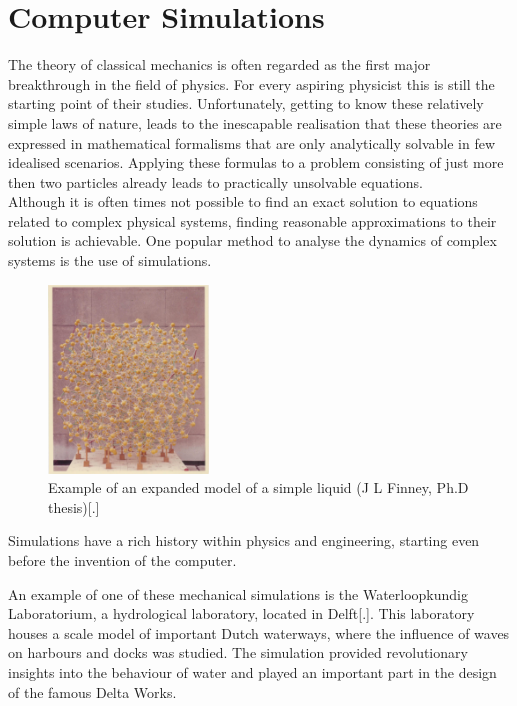 \newpage
\section{Computer Simulations}

The theory of classical mechanics is often regarded as the first major breakthrough in
the field of physics. For every aspiring physicist this is still the starting point of
their studies. Unfortunately, getting to know these relatively simple laws of nature,
leads to the inescapable realisation that these theories are expressed in mathematical
formalisms that are only analytically solvable in few idealised scenarios. Applying these
formulas to a problem consisting of just more then two particles already leads to
practically unsolvable equations.\\

Although it is often times not possible to find an exact solution to equations
related to complex physical systems, finding reasonable approximations to their solution
is achievable. One popular method to analyse the dynamics of complex systems is the use
of simulations.\\

\begin{figure}
  \begin{center}
    \includegraphics[width=0.38\textwidth]{Figures/WaterModel.png}
  \end{center}
  \caption{Example of an expanded model of a simple liquid (J L Finney, Ph.D thesis)[.]}
\end{figure}

Simulations have a rich history within physics and engineering, starting even before the
invention of the computer.

An example of one of these mechanical simulations is the Waterloopkundig Laboratorium,
a hydrological laboratory, located in Delft[.]. This laboratory houses a scale model of
important Dutch waterways, where the influence of waves on harbours and docks was
studied.  The simulation provided revolutionary insights into the behaviour of water and
played an important part in the design of the famous Delta Works.\\

